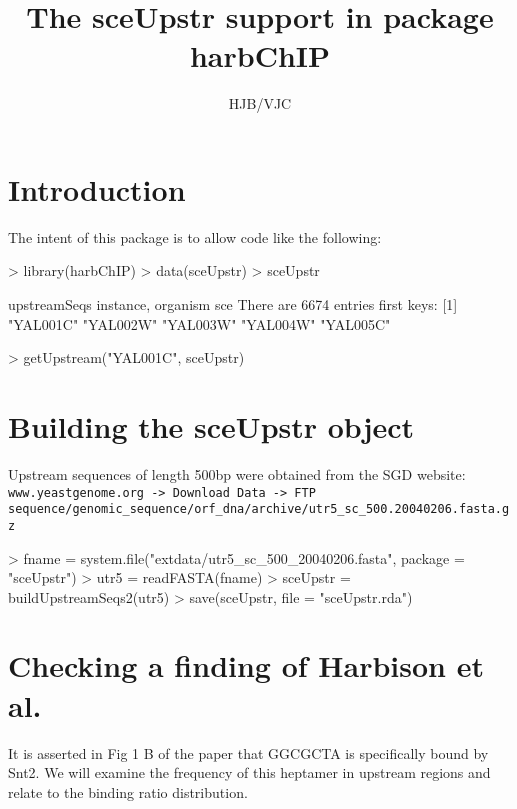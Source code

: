 \documentclass[12pt]{article}
\begin{document}
\title{The sceUpstr support in package harbChIP}
\author{HJB/VJC}
\maketitle

\tableofcontents

\section{Introduction}

The intent of this package is to allow code like the following:
\begin{Schunk}
\begin{Sinput}
> library(harbChIP)
> data(sceUpstr)
> sceUpstr
\end{Sinput}
\begin{Soutput}
upstreamSeqs instance, organism  sce 
There are  6674  entries
first keys: 
[1] "YAL001C" "YAL002W" "YAL003W" "YAL004W" "YAL005C"
\end{Soutput}
\begin{Sinput}
> getUpstream("YAL001C", sceUpstr)
\end{Sinput}
\end{Schunk}

\section{Building the sceUpstr object}

Upstream sequences of length 500bp were obtained from the SGD website:\\
\texttt{www.yeastgenome.org -> Download Data -> FTP}\\
\texttt{sequence/genomic\_sequence/orf\_dna/archive/utr5\_sc\_500.20040206.fasta.gz}

\begin{Schunk}
\begin{Sinput}
> fname = system.file("extdata/utr5_sc_500_20040206.fasta", package = "sceUpstr")
> utr5 = readFASTA(fname)
> sceUpstr = buildUpstreamSeqs2(utr5)
> save(sceUpstr, file = "sceUpstr.rda")
\end{Sinput}
\end{Schunk}

\section{Checking a finding of Harbison et al.}

It is asserted in Fig 1 B of the paper that GGCGCTA is specifically bound by Snt2.
We will examine the frequency of this heptamer in upstream regions and relate to the
binding ratio distribution.
\end{document}
